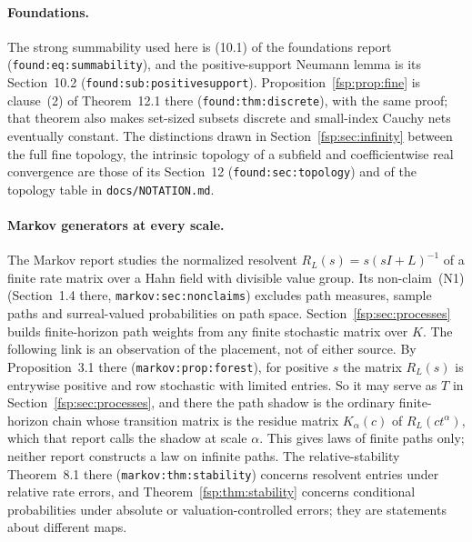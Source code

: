 \documentclass[11pt,a4paper]{article}
\numberwithin{equation}{section}
\theoremstyle{definition}
\theoremstyle{remark}
\begin{document}
\paragraph{Foundations.}
The strong summability used here is (10.1) of the foundations report
\cite{repofound} (\nolinkurl{found:eq:summability}), and the positive-support
Neumann lemma is its Section~10.2 (\nolinkurl{found:sub:positivesupport}).
Proposition~\ref{fsp:prop:fine} is clause~(2) of Theorem~12.1 there
(\nolinkurl{found:thm:discrete}), with the same proof; that theorem also makes
set-sized subsets discrete and small-index Cauchy nets eventually constant.
The distinctions drawn in Section~\ref{fsp:sec:infinity} between the full fine
topology, the intrinsic topology of a subfield and coefficientwise real
convergence are those of its Section~12 (\nolinkurl{found:sec:topology}) and of
the topology table in \nolinkurl{docs/NOTATION.md}.

\paragraph{Markov generators at every scale.}
The Markov report \cite{repomarkov} studies the normalized resolvent
$R_L(s)=s(sI+L)^{-1}$ of a finite rate matrix over a Hahn field with divisible
value group. Its non-claim~(N1) (Section~1.4 there,
\nolinkurl{markov:sec:nonclaims}) excludes path measures, sample paths and
surreal-valued probabilities on path space. Section~\ref{fsp:sec:processes}
builds finite-horizon path weights from any finite stochastic matrix over $K$.
The following link is an observation of the placement, not of either source.
By Proposition~3.1 there (\nolinkurl{markov:prop:forest}), for positive $s$ the
matrix $R_L(s)$ is entrywise positive and row stochastic with limited entries.
So it may serve as $T$ in Section~\ref{fsp:sec:processes}, and there the path
shadow is the ordinary finite-horizon chain whose transition matrix is the
residue matrix $K_\alpha(c)$ of $R_L(ct^\alpha)$, which that report calls the
shadow at scale $\alpha$. This gives laws of finite paths only; neither report
constructs a law on infinite paths. The relative-stability Theorem~8.1 there
(\nolinkurl{markov:thm:stability}) concerns resolvent entries under relative rate
errors, and Theorem~\ref{fsp:thm:stability} concerns conditional probabilities
under absolute or valuation-controlled errors; they are statements about
different maps.
\end{document}
